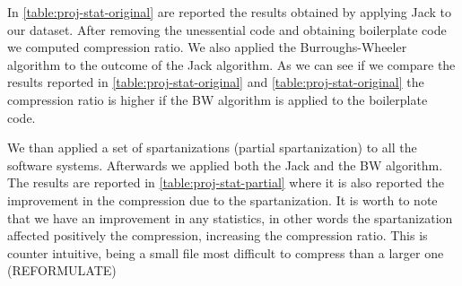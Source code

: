 
% 
% 
% 

In \cref{table:proj-stat-original} are reported the results obtained by applying Jack to our dataset. 
After removing the unessential code and obtaining boilerplate code we computed compression ratio. 
We also applied the Burroughs-Wheeler algorithm to the outcome of the Jack algorithm.
As we can see if we compare the results reported in \cref{table:proj-stat-original}
and \cref{table:proj-stat-original} the compression ratio is higher if the BW algorithm
is applied to the boilerplate code.

\begin{table}
\centering
{}
\label{table:proj-stat-original}
\caption{The results of the compression using the Jack algorithm alone and both Jack and 
Burroughs-Wheeler algorithms combined.}
\end{table}

We than applied a set of spartanizations (partial spartanization) to all the
software systems.  Afterwards we applied both the Jack and the BW algorithm.
The results are reported in \cref{table:proj-stat-partial} where it is also
reported the improvement in the compression due to the spartanization.  It is
worth to note that we have an improvement in any statistics, in other words the
spartanization affected positively the compression, increasing the compression
ratio.  This is counter intuitive, being a small file most difficult to
compress than a larger one (REFORMULATE)


